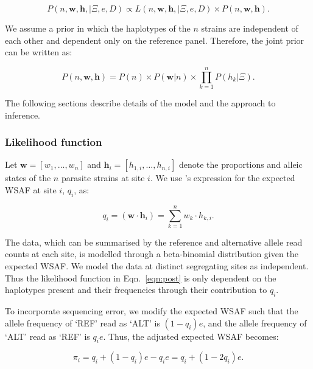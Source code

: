 \documentclass{bioinfo}
\begin{document}
\begin{equation}
P(n, \mathbf{w}, \mathbf{h}, | \Xi, e, D) \propto L(n, \mathbf{w}, \mathbf{h}, | \Xi, e, D) \times P(n, \mathbf{w}, \mathbf{h}). \label{eqn:post}
\end{equation}

\noindent We assume a prior in which the haplotypes of the $n$ strains are independent of each other and dependent only on the reference panel.  Therefore, the joint prior can be written as:

\begin{equation}
P(n, \mathbf{w}, \mathbf{h}) = P(n) \times P(\mathbf{w} | n) \times \prod_{k=1}^{n} P(h_k | \Xi).
\end{equation}

\noindent The following sections describe details of the model and the approach to inference.


\subsubsection{Likelihood function}

Let $\mathbf w = [w_1,\dots, w_n]$ and $\mathbf{h}_i = [h_{1,i},\dots,h_{n,i}]$ denote the proportions and alleic states of the $n$ parasite strains at site $i$. We use \citet{Jack2016}'s expression for the expected WSAF at site $i$, $q_{i}$, as:

\begin{equation}
q_i= (\mathbf{w}\cdot\mathbf{h}_{i})  =  \sum_{k=1}^{n} w_k \cdot h_{k,i} .\label{eqn:qij_full_sum}
\end{equation}

\noindent The data, which can be summarised by the reference and alternative allele read counts at each site, is modelled through a beta-binomial distribution given the expected WSAF.  We model the data at distinct segregating sites as independent.  Thus the likelihood function  in Eqn.~\eqref{eqn:post} is only dependent on the haplotypes present and their frequencies through their contribution to $q_{i}$.


To incorporate sequencing error, we modify the expected WSAF such that the allele frequency of `REF' read as `ALT' is $(1 - q_i)e$, and the allele frequency of `ALT' read as `REF' is $q_ie$. Thus, the adjusted expected WSAF becomes:

\begin{equation}
\pi_i = q_i + (1 - q_i)e - q_ie = q_i + (1 - 2q_i)e.\label{eqn:adj_q}
\end{equation}
\end{document}
